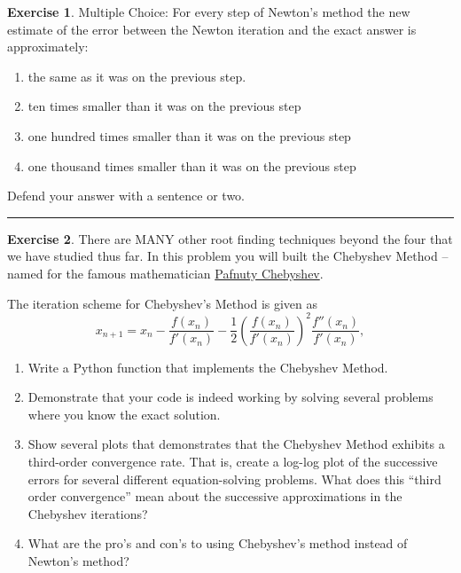 \documentclass[
]{book}
\providecommand{\tightlist}{%
  \setlength{\itemsep}{0pt}\setlength{\parskip}{0pt}}
\theoremstyle{definition}
\theoremstyle{definition}
\theoremstyle{definition}
\newtheorem{exercise}{Exercise}[chapter]
\theoremstyle{remark}
\begin{document}
\begin{exercise}
\protect\hypertarget{exr:unnamed-chunk-124}{}{\label{exr:unnamed-chunk-124} }Multiple Choice: For every step of Newton's method the new estimate of
the error between the Newton iteration and the exact answer is
approximately:

\begin{enumerate}
\def\labelenumi{\alph{enumi}.}
\item
  the same as it was on the previous step.
\item
  ten times smaller than it was on the previous step
\item
  one hundred times smaller than it was on the previous step
\item
  one thousand times smaller than it was on the previous step
\end{enumerate}

Defend your answer with a sentence or two.
\end{exercise}

\begin{center}\rule{0.5\linewidth}{0.5pt}\end{center}

\begin{exercise}
\protect\hypertarget{exr:unnamed-chunk-125}{}{\label{exr:unnamed-chunk-125} }There are MANY other root finding techniques beyond the four that we have studied thus far. In this problem you will built the Chebyshev Method -- named for the famous mathematician \href{https://en.wikipedia.org/wiki/Pafnuty_Chebyshev}{Pafnuty Chebyshev}.

The iteration scheme for Chebyshev's Method is given as
\[x_{n+1} = x_n - \frac{f(x_n)}{f'(x_n)} - \frac{1}{2} \left( \frac{f(x_n)}{f'(x_n)}
    \right)^2 \frac{f''(x_n)}{f'(x_n)},\]

\begin{enumerate}
\def\labelenumi{\alph{enumi}.}
\tightlist
\item
  Write a Python function that implements the Chebyshev Method.
\item
  Demonstrate that your code is indeed working by solving several problems where you know the exact solution.
\item
  Show several plots that demonstrates that the Chebyshev Method exhibits a third-order
  convergence rate. That is, create a log-log plot of the successive errors for several different equation-solving problems. What does this ``third order convergence'' mean about the successive approximations in the Chebyshev iterations?
\item
  What are the pro's and con's to using Chebyshev's method instead of Newton's method?
\end{enumerate}
\end{exercise}
\end{document}
